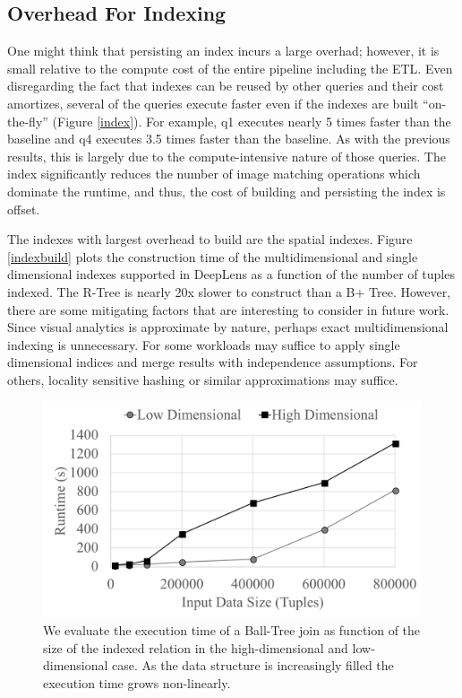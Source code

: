 \subsection{Overhead For Indexing}
One might think that persisting an index incurs a large overhad; however, it is small relative to the compute cost of the entire pipeline including the ETL.
Even disregarding the fact that indexes can be reused by other queries and their cost amortizes, several of the queries execute faster even if the indexes are built ``on-the-fly'' (Figure \ref{index}).
For example, q1 executes nearly 5 times faster than the baseline and q4 executes 3.5 times faster than the baseline.
As with the previous results, this is largely due to the compute-intensive nature of those queries.
The index significantly reduces the number of image matching operations which dominate the runtime, and thus, the cost of building and persisting the index is offset.

The indexes with largest overhead to build are the spatial indexes.
Figure \ref{indexbuild} plots the construction time of the multidimensional and single dimensional indexes supported in \textsf{DeepLens} as a function of the number of tuples indexed.
The R-Tree is nearly 20x slower to construct than a B+ Tree.
However, there are some mitigating factors that are interesting to consider in future work.
Since visual analytics is approximate by nature, perhaps exact multidimensional indexing is unnecessary. 
For some workloads may suffice to apply single dimensional indices and merge results with independence assumptions.
For others, locality sensitive hashing or similar approximations may suffice.

\begin{figure}[t]
\centering
 \includegraphics[width=\columnwidth]{figures/spatialjoin.png}
 \caption{We evaluate the execution time of a Ball-Tree join as function of the size of the indexed relation in the high-dimensional and low-dimensional case. As the data structure is increasingly filled the execution time grows non-linearly.   \label{join} }
\end{figure}


